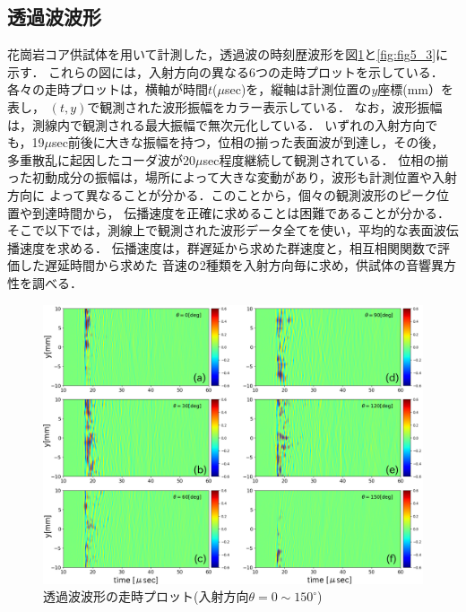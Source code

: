 \subsection{透過波波形}
花崗岩コア供試体を用いて計測した，透過波の時刻歴波形を図\ref{fig:fig5_2}と\ref{fig:fig5_3}に示す．
これらの図には，入射方向の異なる6つの走時プロットを示している．
各々の走時プロットは，横軸が時間$t$($\mu$sec)を，縦軸は計測位置の$y$座標(mm）を表し，
$(t,y)$で観測された波形振幅をカラー表示している．
なお，波形振幅は，測線内で観測される最大振幅で無次元化している．
いずれの入射方向でも，19$\mu$sec前後に大きな振幅を持つ，位相の揃った表面波が到達し，その後，
多重散乱に起因したコーダ波が20$\mu$sec程度継続して観測されている．
位相の揃った初動成分の振幅は，場所によって大きな変動があり，波形も計測位置や入射方向に
よって異なることが分かる．このことから，個々の観測波形のピーク位置や到達時間から，
伝播速度を正確に求めることは困難であることが分かる．
そこで以下では，測線上で観測された波形データ全てを使い，平均的な表面波伝播速度を求める．
伝播速度は，群遅延から求めた群速度と，相互相関関数で評価した遅延時間から求めた
音速の2種類を入射方向毎に求め，供試体の音響異方性を調べる．
\begin{figure}[h]
	\begin{center}
	\includegraphics[width=1.0\linewidth]{Figs/fig5_2.eps} 
	\end{center}
	\caption{
		透過波波形の走時プロット(入射方向$\theta=0\sim 150^{\circ}$)
	} 
	\label{fig:fig5_2}
\end{figure}
